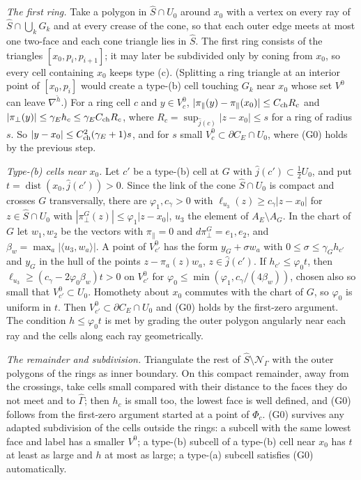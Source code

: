 \emph{The first ring.} Take a polygon in $\hat S\cap U_0$ around $x_0$ with a vertex on every ray of $\hat S\cap\bigcup_kG_k$ and at every crease of the cone, so that each outer edge meets at most one two-face and each cone triangle lies in $\hat S$. The first ring consists of the triangles $[x_0,p_i,p_{i+1}]$; it may later be subdivided only by coning from $x_0$, so every cell containing $x_0$ keeps type (c). (Splitting a ring triangle at an interior point of $[x_0,p_i]$ would create a type-(b) cell touching $G_k$ near $x_0$ whose set $V^0$ can leave $\nabla^{\check h}$.) For a ring cell $c$ and $y\in V^0_c$, $|\pi_\parallel(y)-\pi_\parallel(x_0)|\le C_{\rm ch}R_c$ and $|\pi_\perp(y)|\le \gamma_Eh_c\le \gamma_EC_{\rm ch}R_c$, where $R_c=\sup_{\hat j(c)}|z-x_0|\le s$ for a ring of radius $s$. So $|y-x_0|\le C_{\rm ch}^2(\gamma_E+1)s$, and for $s$ small $V^0_c\subset\partial C_E\cap U_0$, where (G0) holds by the previous step.

\emph{Type-(b) cells near $x_0$.} Let $c'$ be a type-(b) cell at $G$ with $\hat j(c')\subset\frac12U_0$, and put $t=\operatorname{dist}(x_0,\hat j(c'))>0$. Since the link of the cone $\hat S\cap U_0$ is compact and crosses $G$ transversally, there are $\varphi_1,c_\gamma>0$ with $\ell_{u_3}(z)\ge c_\gamma|z-x_0|$ for $z\in\hat S\cap U_0$ with $|\pi^G_\perp(z)|\le\varphi_1|z-x_0|$, $u_3$ the element of $A_E\setminus A_G$. In the chart of $G$ let $w_1,w_2$ be the vectors with $\pi_\parallel=0$ and $d\pi^G_\perp=e_1,e_2$, and $\beta_w=\max_a|\langle u_3,w_a\rangle|$. A point of $V^0_{c'}$ has the form $y_G+\sigma w_a$ with $0\le\sigma\le \gamma_Gh_{c'}$ and $y_G$ in the hull of the points $z-\pi_a(z)w_a$, $z\in\hat j(c')$. If $h_{c'}\le\varphi_0t$, then $\ell_{u_3}\ge(c_\gamma-2\varphi_0\beta_w)t>0$ on $V^0_{c'}$ for $\varphi_0\le\min(\varphi_1,c_\gamma/(4\beta_w))$, chosen also so small that $V^0_{c'}\subset U_0$. Homothety about $x_0$ commutes with the chart of $G$, so $\varphi_0$ is uniform in $t$. Then $V^0_{c'}\subset\partial C_E\cap U_0$ and (G0) holds by the first-zero argument. The condition $h\le\varphi_0t$ is met by grading the outer polygon angularly near each ray and the cells along each ray geometrically.

\emph{The remainder and subdivision.} Triangulate the rest of $\hat S\setminus \mathcal N_\Gamma$ with the outer polygons of the rings as inner boundary. On this compact remainder, away from the crossings, take cells small compared with their distance to the faces they do not meet and to $\widehat\Gamma$; then $h_c$ is small too, the lowest face is well defined, and (G0) follows from the first-zero argument started at a point of $\Phi_c$. (G0) survives any adapted subdivision of the cells outside the rings: a subcell with the same lowest face and label has a smaller $V^0$; a type-(b) subcell of a type-(b) cell near $x_0$ has $t$ at least as large and $h$ at most as large; a type-(a) subcell satisfies (G0) automatically.

